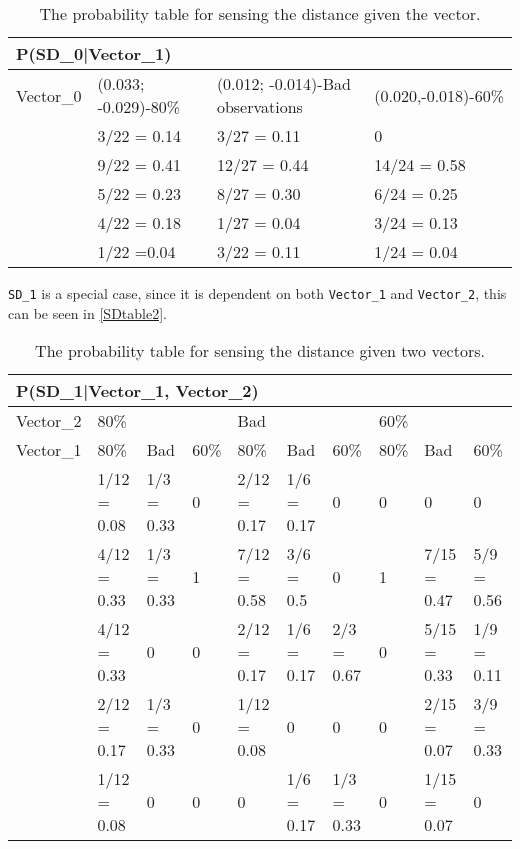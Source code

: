 \begin{center}
\begin{table}[H]
\begin{tabular}{|l|l|l|l|}
\hline
\multicolumn{4}{|l|}{P(SD\_0|Vector\_1)} \\ \hline
Vector\_0     & (0.033; -0.029)-80\% & (0.012; -0.014)-Bad observations &
(0.020,-0.018)-60\% \\\hline 
[0 - 60]      & 3/22 = 0.14 & 3/27 = 0.11 & 0 \\ \hline 
[60 - 75]    & 9/22 = 0.41 & 12/27 = 0.44 & 14/24 = 0.58 \\ \hline
[75 - 90]   & 5/22 = 0.23 & 8/27 = 0.30 & 6/24 = 0.25 \\ \hline
[90 - 105]   & 4/22 = 0.18 & 1/27 = 0.04 & 3/24 = 0.13 \\ \hline
[105 - 255]   & 1/22 =0.04 & 3/22 = 0.11 & 1/24 = 0.04   \\ \hline
\end{tabular}
\caption{The probability table for sensing the distance given the vector.}
\label{SDtable}
\end{table}
\end{center}

\texttt{SD\_1} is a special case, since it is dependent on
both \texttt{Vector\_1} and \texttt{Vector\_2}, this can be seen in
\autoref{SDtable2}.

\begin{table}[H]
\centering
\begin{tabular}{|l|p{1.2cm}|p{1.2cm}|l|p{1.2cm}|p{1.2cm}|p{1.2cm}|l|p{1.2cm}|p{1.2cm}|}
\hline
\multicolumn{10}{|l|}{P(SD\_1|Vector\_1, Vector\_2)} \\\hline 
Vector\_2 & \multicolumn{3}{l|}{80\%} & \multicolumn{3}{l|}{Bad} &
\multicolumn{3}{l|}{60\%}\\\hline 
Vector\_1 & 80\%      &  Bad     & 60\%      & 80\%      & Bad      & 60\%     
& 80\% & Bad & 60\% \\\hline
[0-60]&1/12 = 0.08 & 1/3 = 0.33 & 0      & 2/12 = 0.17 & 1/6 = 0.17 & 0 & 0  
& 0 & 0 \\ \hline
[60-75]&4/12 = 0.33 & 1/3 = 0.33 & 1      & 7/12 = 0.58 & 3/6 = 0.5 & 0      & 1     
& 7/15 = 0.47 & 5/9 = 0.56\\ \hline
[75-90] & 4/12 = 0.33 & 0 & 0 & 2/12 = 0.17 & 1/6 = 0.17 & 2/3 = 0.67 & 0 
& 5/15 = 0.33 &1/9 = 0.11\\\hline
[90-105] & 2/12 = 0.17 & 1/3 = 0.33 & 0 & 1/12 = 0.08 & 0 & 0 & 0 
& 2/15 = 0.07  & 3/9 = 0.33\\\hline
[105-255] & 1/12 = 0.08 & 0 & 0 & 0 & 1/6 = 0.17 & 1/3 = 0.33 & 0 & 1/15 = 0.07     
&0\\\hline
\end{tabular}
\caption{The probability table for sensing the distance given two vectors.}
\label{SDtable2}
\end{table}


